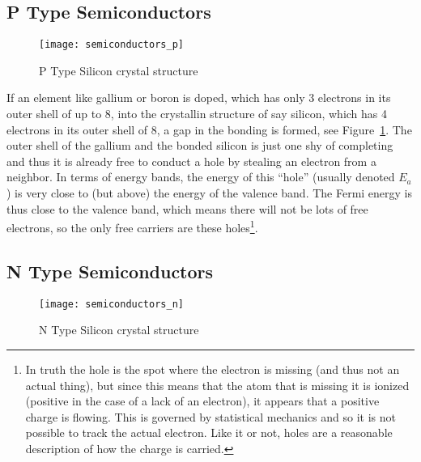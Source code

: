 


\subsection{P Type Semiconductors}

\begin{figure}
\begin{center}
\caption{P Type Silicon crystal structure}\label{f-semiconductor-p}
\texttt{[image: semiconductors\_p]}
\end{center}
\end{figure}
If an element like gallium or boron is doped, which has only 3 electrons in its outer shell of up to 8, into the crystallin structure of say silicon, which has 4 electrons in its outer shell of 8, a gap in the bonding is formed, see Figure~\ref{f-semiconductor-p}.  The outer shell of the gallium and the bonded silicon is just one shy of completing and thus it is already free to conduct a hole by stealing an electron from a neighbor.  In terms of energy bands, the energy of this ``hole'' (usually denoted $E_a$) is very close to (but above) the energy of the valence band.  The Fermi energy is thus close to the valence band, which means there will not be lots of free electrons, so the only free carriers are these holes\footnote{In truth the hole is the spot where the electron is missing (and thus not an actual thing), but since this means that the atom that is missing it is ionized (positive in the case of a lack of an electron), it appears that a positive charge is flowing.  This is governed by statistical mechanics and so it is not possible to track the actual electron.  Like it or not, holes are a reasonable description of how the charge is carried.}.

\subsection{N Type Semiconductors}
\begin{figure}
\begin{center}
\caption{N Type Silicon crystal structure}\label{f-semiconductor-n}
\texttt{[image: semiconductors\_n]}
\end{center}
\end{figure}



